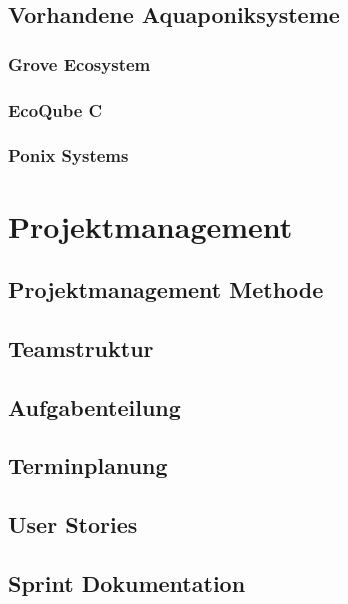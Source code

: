 \documentclass[12pt]{article}
\begin{document}
\subsection{Vorhandene Aquaponiksysteme}
%

\newpage
\subsubsection{Grove Ecosystem}
%

\subsubsection{EcoQube C}
%

\subsubsection{Ponix Systems}
%



\newpage %
\section{Projektmanagement}
%

\subsection{Projektmanagement Methode}
%

\subsection{Teamstruktur}
%

\subsection{Aufgabenteilung}
%

\subsection{Terminplanung}
%

\subsection{User Stories}
%

\subsection{Sprint Dokumentation}
%
\end{document}
